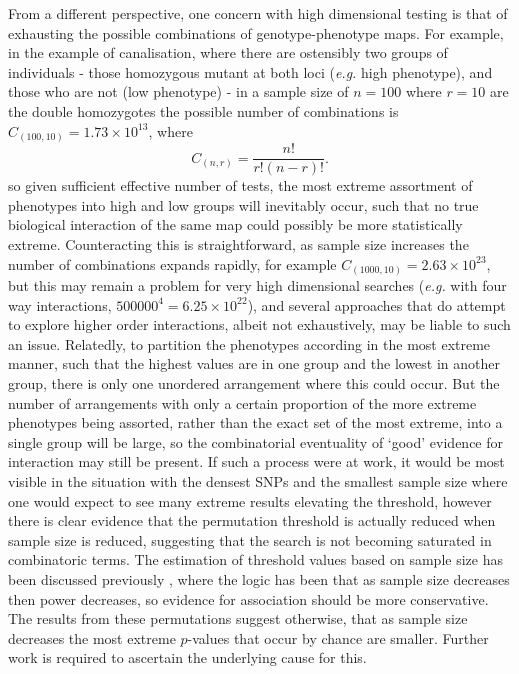From a different perspective, one concern with high dimensional testing is that of exhausting the possible combinations of genotype-phenotype maps. For example, in the example of canalisation, where there are ostensibly two groups of individuals - those homozygous mutant at both loci (\emph{e.g.} high phenotype), and those who are not (low phenotype) - in a sample size of $n = 100$ where $r = 10$ are the double homozygotes the possible number of combinations is $C_{(100,10)} = 1.73 \times 10^{13}$, where
\begin{equation}
C_{(n,r)} = \frac{n!}{r!(n-r)!}.
\end{equation}
so given sufficient effective number of tests, the most extreme assortment of phenotypes into high and low groups will inevitably occur, such that no true biological interaction of the same map could possibly be more statistically extreme. Counteracting this is straightforward, as sample size increases the number of combinations expands rapidly, for example $C_{(1000,10)}  = 2.63 \times 10^{23}$, but this may remain a problem for very high dimensional searches (\emph{e.g.} with four way interactions, $500000^4 = 6.25 \times 10^{22}$), and several approaches that do attempt to explore higher order interactions, albeit not exhaustively, may be liable to such an issue. Relatedly, to partition the phenotypes according in the most extreme manner, such that the highest values are in one group and the lowest in another group, there is only one unordered arrangement where this could occur. But the number of arrangements with only a certain proportion of the more extreme phenotypes being assorted, rather than the exact set of the most extreme, into a single group will be large, so the combinatorial eventuality of `good' evidence for interaction may still be present. If such a process were at work, it would be most visible in the situation with the densest SNPs and the smallest sample size where one would expect to see many extreme results elevating the threshold, however there is clear evidence that the permutation threshold is actually reduced when sample size is reduced, suggesting that the search is not becoming saturated in combinatoric terms. The estimation of threshold values based on sample size has been discussed previously \citep{TheWellcomeTrustCaseControlConsortium2007}, where the logic has been that as sample size decreases then power decreases, so evidence for association should be more conservative. The results from these permutations suggest otherwise, that as sample size decreases the most extreme $p$-values that occur by chance are smaller. Further work is required to ascertain the underlying cause for this.

